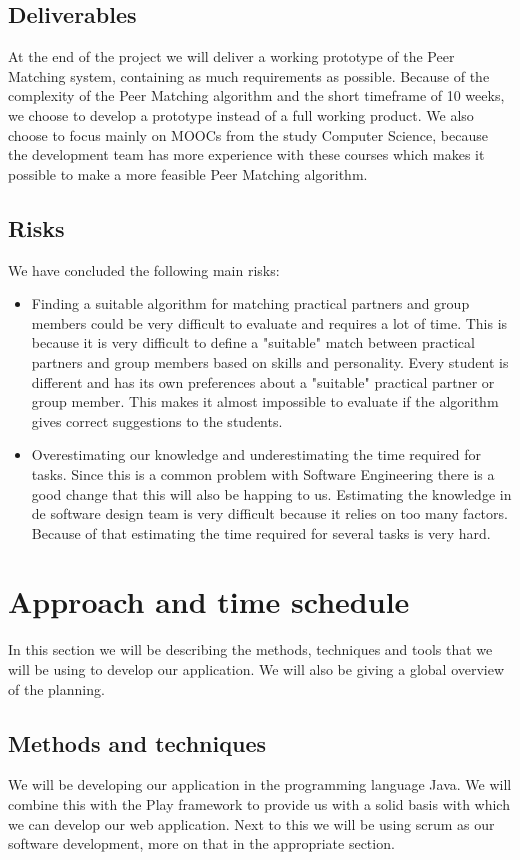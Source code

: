 \documentclass[]{article}
\begin{document}
\subsection{Deliverables}
At the end of the project we will deliver a working prototype of the Peer Matching system, containing as much requirements as possible.
Because of the complexity of the Peer Matching algorithm and the short timeframe of 10 weeks, we choose to develop a prototype instead of a full working product.
We also choose to focus mainly on MOOCs from the study Computer Science, because the development team has more experience with these courses which makes it possible to make a more feasible Peer Matching algorithm.

\subsection{Risks}
We have concluded the following main risks:

\begin{itemize}
\item Finding a suitable algorithm for matching practical partners and group members could be very difficult to evaluate and requires a lot of time.
This is because it is very difficult to define a "suitable" match between practical partners and group members based on skills and personality.
Every student is different and has its own preferences about a "suitable" practical partner or group member.
This makes it almost impossible to evaluate if the algorithm gives correct suggestions to the students.

\item Overestimating our knowledge and underestimating the time required for tasks.
Since this is a common problem with Software Engineering there is a good change that this will also be happing to us.
Estimating the knowledge in de software design team is very difficult because it relies on too many factors.
Because of that estimating the time required for several tasks is very hard.
\end{itemize}

\section{Approach and time schedule}
In this section we will be describing the methods, techniques and tools that we will be using to develop our application.
We will also be giving a global overview of the planning.

\subsection{Methods and techniques}
We will be developing our application in the programming language Java.
We will combine this with the Play framework to provide us with a solid basis with which we can develop our web application.
Next to this we will be using scrum as our software development, more on that in the appropriate section.
\end{document}
